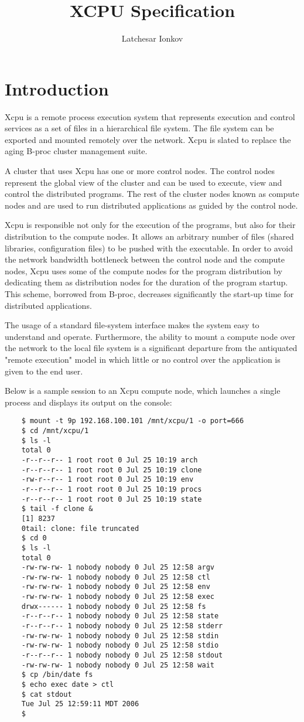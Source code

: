 \documentclass[draft]{article}
\begin{document}
\begin{titlepage}
\title{XCPU Specification}
\author{Latchesar Ionkov}
\date{}
\end{titlepage}

\section{Introduction}
Xcpu is a remote process execution system that represents
execution and control services as a set of files in a hierarchical
file system. The file system can be exported and mounted  remotely
over the network.  Xcpu is slated to replace the aging B-proc cluster
management suite.

A cluster that uses Xcpu has one or more control nodes. The control
nodes represent the global view of the cluster and can be used to
execute, view and control the distributed programs. The rest of the
cluster nodes known as compute nodes and are used to run distributed
applications as guided by the control node.

Xcpu is responsible not only for the execution of the programs, but
also for their distribution to the compute nodes. It allows an
arbitrary number of files (shared libraries, configuration files)
to be pushed with the executable. In order to avoid the network
bandwidth bottleneck between the control node and the compute nodes,
Xcpu uses some of the compute nodes for the program distribution
by dedicating them as distribution nodes for the duration of the
program startup. This scheme, borrowed from B-proc, decreases
significantly the start-up time for distributed applications.

The usage of a standard file-system interface makes the system easy
to understand and operate. Furthermore, the ability to mount a
compute node over the network to the local file system is a significant
departure from the antiquated "remote execution" model in which
little or no control over the application is given to the end user.

Below is a sample session to an Xcpu compute node, which launches
a single process and displays its output on the console:
\begin{verbatim}
	$ mount -t 9p 192.168.100.101 /mnt/xcpu/1 -o port=666
	$ cd /mnt/xcpu/1
	$ ls -l
	total 0
	-r--r--r-- 1 root root 0 Jul 25 10:19 arch
	-r--r--r-- 1 root root 0 Jul 25 10:19 clone
	-rw-r--r-- 1 root root 0 Jul 25 10:19 env
	-r--r--r-- 1 root root 0 Jul 25 10:19 procs
	-r--r--r-- 1 root root 0 Jul 25 10:19 state
	$ tail -f clone &
	[1] 8237
	0tail: clone: file truncated
	$ cd 0
	$ ls -l
	total 0
	-rw-rw-rw- 1 nobody nobody 0 Jul 25 12:58 argv
	-rw-rw-rw- 1 nobody nobody 0 Jul 25 12:58 ctl
	-rw-rw-rw- 1 nobody nobody 0 Jul 25 12:58 env
	-rw-rw-rw- 1 nobody nobody 0 Jul 25 12:58 exec
	drwx------ 1 nobody nobody 0 Jul 25 12:58 fs
	-r--r--r-- 1 nobody nobody 0 Jul 25 12:58 state
	-r--r--r-- 1 nobody nobody 0 Jul 25 12:58 stderr
	-rw-rw-rw- 1 nobody nobody 0 Jul 25 12:58 stdin
	-rw-rw-rw- 1 nobody nobody 0 Jul 25 12:58 stdio
	-r--r--r-- 1 nobody nobody 0 Jul 25 12:58 stdout
	-rw-rw-rw- 1 nobody nobody 0 Jul 25 12:58 wait
	$ cp /bin/date fs
	$ echo exec date > ctl
	$ cat stdout 
	Tue Jul 25 12:59:11 MDT 2006
	$
\end{verbatim}
\end{document}
